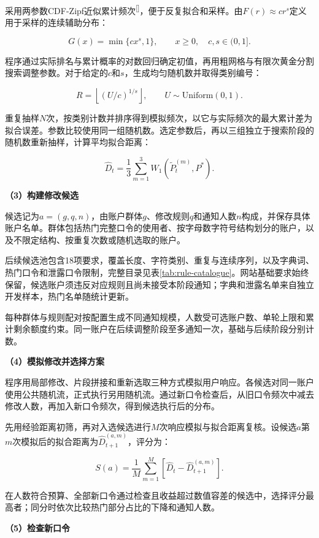 \documentclass{crypto_report}
\renewcommand{\cite}[1]{\textsuperscript{[\citen{#1}]}}%
\begin{document}
采用两参数CDF-Zipf近似累计频次\cite{wang2017zipf}，便于反复拟合和采样。由$F(r)\approx cr^s$定义用于采样的连续辅助分布：

\[G(x)=\min\{cx^s,1\},\qquad x\geq0,\quad c,s\in(0,1].\]

程序通过实际排名与累计概率的对数回归确定初值，再用粗网格与有限次黄金分割搜索调整参数。对于给定的$c$和$s$，生成均匀随机数并取得类别编号：

\[R=\left\lfloor(U/c)^{1/s}\right\rfloor,\qquad U\sim\mathrm{Uniform}(0,1).\]

重复抽样$N$次，按类别计数并排序得到模拟频次，以它与实际频次的最大累计差为拟合误差。参数比较使用同一组随机数。选定参数后，再以三组独立于搜索阶段的随机数重新抽样，计算平均拟合距离：

\[\widehat D_t=\frac{1}{3}\sum_{m=1}^3 W_1(\widetilde P_t^{(m)},P^*).\]

\par\smallskip
\noindent\textbf{（3）构建修改候选}
\nopagebreak[4]

候选记为$a=(g,q,n)$，由账户群体$g$、修改规则$q$和通知人数$n$构成，并保存具体账户名单。群体包括热门完整口令的使用者、按字母数字符号结构划分的账户，以及不限定结构、按重复次数或随机选取的账户。

后续候选池包含18项要求，覆盖长度、字符类别、重复与连续序列，以及字典词、热门口令和泄露口令限制，完整目录见表\ref{tab:rule-catalogue}。网站基础要求始终保留，候选账户须违反对应规则且尚未接受本阶段通知；字典和泄露名单来自独立开发样本，热门名单随统计更新。

每种群体与规则配对按配置生成不同通知规模，人数受可选账户数、单轮上限和累计剩余额度约束。同一账户在后续调整阶段至多通知一次，基础与后续阶段分别计数。

\par\smallskip
\noindent\textbf{（4）模拟修改并选择方案}
\nopagebreak[4]

程序用局部修改、片段拼接和重新选取三种方式模拟用户响应。各候选对同一账户使用公共随机流，正式执行另用随机流。通过新口令检查后，从旧口令频次中减去修改人数，再加入新口令频次，得到候选执行后的分布。

先用经验距离初筛，再对入选候选进行$M$次响应模拟与拟合距离复核。设候选$a$第$m$次模拟后的拟合距离为$\widehat D_{t+1}^{(a,m)}$，评分为：

\[S(a)=\frac{1}{M}\sum_{m=1}^M[\widehat D_t-\widehat D_{t+1}^{(a,m)}].\]

在人数符合预算、全部新口令通过检查且收益超过数值容差的候选中，选择评分最高者；同分时依次比较热门部分占比的下降和通知人数。

\par\smallskip
\noindent\textbf{（5）检查新口令}
\nopagebreak[4]
\end{document}
